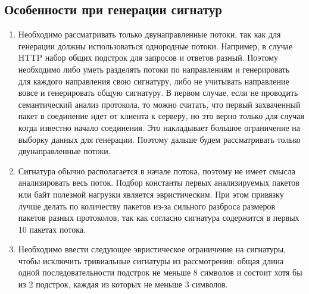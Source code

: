 \subsection{Особенности при генерации сигнатур}

\begin{enumerate}
    \item
    Необходимо рассматривать только двунаправленные потоки, так как для генерации должны использоваться однородные потоки.
    Например, в случае HTTP набор общих подстрок для запросов и ответов разный.
    Поэтому необходимо либо уметь разделять потоки по направлениям и генерировать для каждого направления свою сигнатуру,
    либо не учитывать направление вовсе и генерировать общую сигнатуру.
    В первом случае, если не проводить семантический анализ протокола, то можно считать, что первый захваченный пакет
    в соединение идет от клиента к серверу, но это верно только для случая когда известно начало соединения.
    Это накладывает большое ограничение на выборку данных для генерации.
    Поэтому дальше будем рассматривать только двунаправленные потоки.

    \item
    Сигнатура обычно располагается в начале потока, поэтому не имеет смысла анализировать весь поток.
    Подбор константы первых анализируемых пакетов или байт полезной нагрузки является эвристическим.
    При этом привязку лучше делать по количеству пакетов из-за сильного разброса размеров пакетов разных протоколов,
    так как согласно \cite{park2008towards} сигнатура содержится в первых 10 пакетах потока.

    \item
    Необходимо ввести следующее эвристическое ограничение на сигнатуры, чтобы исключить тривиальные сигнатуры из рассмотрения:
    общая длина одной последовательности подстрок не меньше 8 символов
    и состоит хотя бы из 2 подстрок, каждая из которых не меньше 3 символов.


\end{enumerate}
